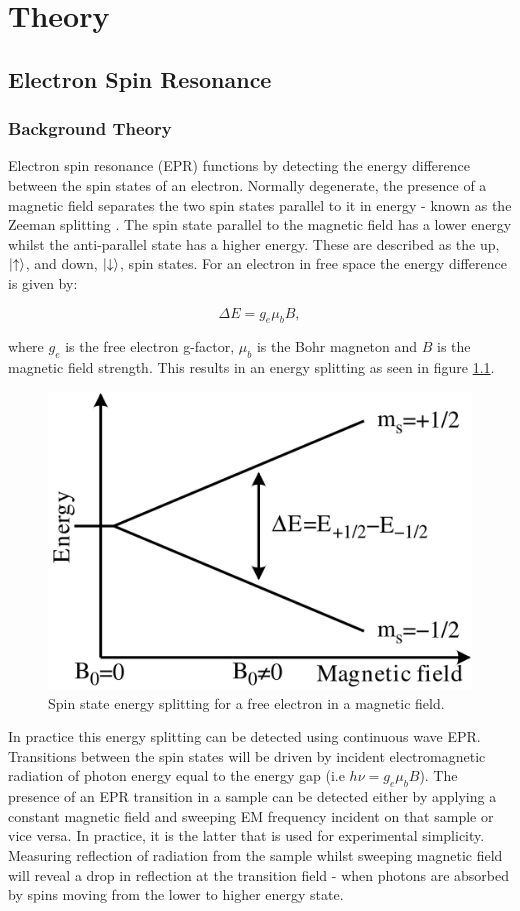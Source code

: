 
\chapter{Theory}

\section{Electron Spin Resonance}
\subsection{Background Theory}

Electron spin resonance (EPR) functions by detecting the energy difference between the spin states of an electron.
Normally degenerate, the presence of a magnetic field separates the two spin states parallel to it in energy - known as the Zeeman splitting \cite{Feher1959}.
The spin state parallel to the magnetic field has a lower energy whilst the anti-parallel state has a higher energy.
These are described as the up, $\ket{\uparrow}$, and down, $\ket{\downarrow}$, spin states.
For an electron in free space the energy difference is given by:

\begin{equation}
\Delta E = g_e\mu_bB,
\label{eq:enSplit}
\end{equation}

where $g_e$ is the free electron g-factor, $\mu_b$ is the Bohr magneton and $B$ is the magnetic field strength. 
This results in an energy splitting as seen in figure \ref{fig:elecSplit}. 

\begin{figure}
\centering
\includegraphics[width = 0.5\columnwidth]{Figures/EPR_splitting.png}
\caption[Free electron level splitting]{Spin state energy splitting for a free electron in a magnetic field.}
\label{fig:elecSplit}
\end{figure}

In practice this energy splitting can be detected using continuous wave EPR. Transitions between the spin states will be driven by incident electromagnetic radiation of photon energy equal to the energy gap (i.e $h\nu = g_e\mu_bB$). 
The presence of an EPR transition in a sample can be detected either by applying a constant magnetic field and sweeping EM frequency incident on that sample or vice versa.
In practice, it is the latter that is used for experimental simplicity.
Measuring reflection of radiation from the sample whilst sweeping magnetic field will reveal a drop in reflection at the transition field - when photons are absorbed by spins moving from the lower to higher energy state.

